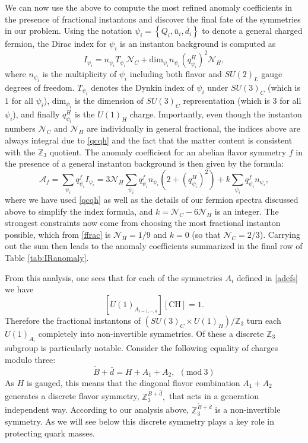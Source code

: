 \documentclass[11pt,a4paper]{article}
\def\beq{\begin{equation}}
\def\eeq{\end{equation}}
\begin{document}
We can now use the above to compute the most refined anomaly coefficients in the presence of fractional instantons and discover the final fate of the symmetries in our problem.    Using the notation $\psi_i = \left\lbrace Q_i, \bar{u}_i, \bar{d}_i \right\rbrace$ to denote a general charged fermion, the Dirac index for $\psi_i$ is an instanton background is computed as
\beq  
I_{\psi_i} = n_{\psi_i} T_{\psi_i} \mathcal{N}_C + \text{dim}_{\psi_i} n_{\psi_i} \left(q^{H}_{\psi_i}\right)^2 \mathcal{N}_H,
\label{eq:Dirac index}
\eeq 
where $n_{\psi_i}$ is the multiplicity of $\psi_i$ including both flavor and $SU(2)_L$ gauge degrees of freedom. $T_{\psi_i}$ denotes the Dynkin index of $\psi_i$ under $SU(3)_C$ (which is $1$ for all $\psi_i$), $\text{dim}_{\psi_i}$ is the dimension of $SU(3)_C$ representation (which is $3$ for all $\psi_i$), and finally $q^{H}_{\psi_i}$ is the $U(1)_H$ charge. Importantly, even though the instanton numbers $\mathcal{N}_{C}$ and $\mathcal{N}_{H}$ are individually in general fractional, the indices above are always integral due to \eqref{qcqh} and the fact that the matter content is consistent with the $\mathbb{Z}_{3}$ quotient. The anomaly coefficient for an abelian flavor symmetry $f$ in the presence of a general instanton background is then given by the formula:
\begin{equation}
    \mathcal{A}_{f}=\sum_{\psi_{i}} q^{f}_{\psi_{i}}I_{\psi_i}=3\mathcal{N}_{H}\sum_{\psi_{i}} q^{f}_{\psi_{i}}n_{\psi_i}\left(2+\left(q^{H}_{\psi_i}\right)^2\right)+k\sum_{\psi_{i}} q^{f}_{\psi_{i}}n_{\psi_i},
\end{equation}
where we have used \eqref{qcqh} as well as the details of our fermion spectra discussed above to simplify the index formula, and $k=\mathcal{N}_{C}-6\mathcal{N}_{H}$ is an integer.  The strongest constraints now come from choosing the most fractional instanton possible, which from \eqref{ffrac} is $\mathcal{N}_{H}=1/9$ and $k=0$ (so that $\mathcal{N}_{C}=2/3$).  Carrying out the sum then leads to the anomaly coefficients summarized in the final row of Table \ref{tab:IRanomaly}.

From this analysis, one sees that for each of the symmetries $A_{i}$ defined in \eqref{adefs} we have
\begin{equation}\label{afracanoms}
    \left[ U(1)_{A_{i=1,\cdots, 4}} \right] [\text{CH}] = 1.
\end{equation}
Therefore the fractional instantons of $(SU(3)_{C}\times U(1)_{H})/\mathbb{Z}_{3}$ turn each $U(1)_{A_i}$ completely into non-invertible symmetries.  Of these a discrete $\mathbb{Z}_{3}$ subgroup is particularly notable.  Consider the following equality of charges modulo three: 
\begin{equation}\label{Z3niv}
    \tilde B + \bar{d} = H+A_{1}+A_{2},~ \ (\text{mod} \ 3)
\end{equation}
As $H$ is gauged, this means that the diagonal flavor combination $A_{1}+A_{2}$ generates a discrete flavor symmetry, $\mathbb{Z}_{3}^{\tilde{B}+\bar{d}},$  that acts in a generation independent way. According to our analysis above, $\mathbb{Z}_{3}^{\tilde{B}+\bar{d}}$ is a non-invertible symmetry.  As we will see below this discrete symmetry plays a key role in protecting quark masses.  
\end{document}
